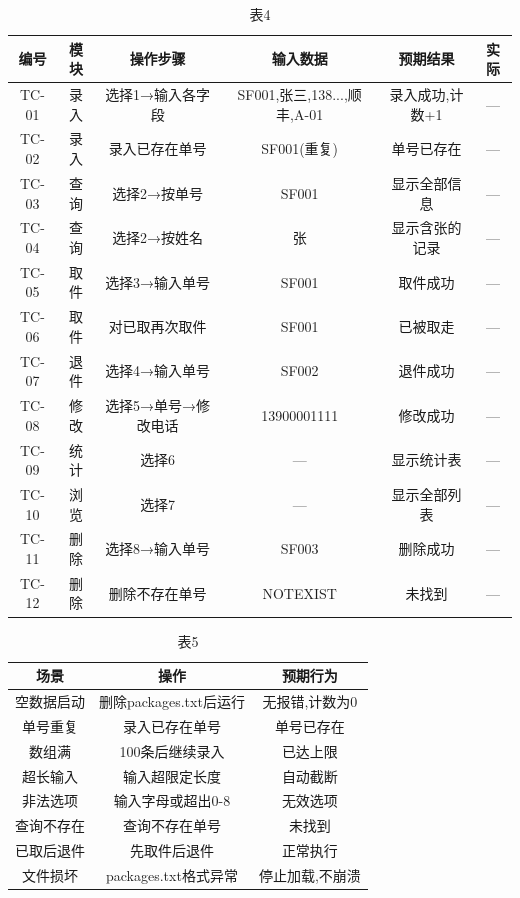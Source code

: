 \documentclass[withoutpreface,bwprint]{cumcmthesis}
\begin{document}
\begin{table}[H]
  \centering
  \caption{表4}
  \label{tab:4}
  \begin{tabular}{|c|c|c|c|c|c|}
    \hline
    编号 & 模块 & 操作步骤 & 输入数据 & 预期结果 & 实际 \\ \hline
    TC-01 & 录入 & 选择1→输入各字段 & SF001,张三,138...,顺丰,A-01 & 录入成功,计数+1 & --- \\ \hline
    TC-02 & 录入 & 录入已存在单号 & SF001(重复) & 单号已存在 & --- \\ \hline
    TC-03 & 查询 & 选择2→按单号 & SF001 & 显示全部信息 & --- \\ \hline
    TC-04 & 查询 & 选择2→按姓名 & 张 & 显示含张的记录 & --- \\ \hline
    TC-05 & 取件 & 选择3→输入单号 & SF001 & 取件成功 & --- \\ \hline
    TC-06 & 取件 & 对已取再次取件 & SF001 & 已被取走 & --- \\ \hline
    TC-07 & 退件 & 选择4→输入单号 & SF002 & 退件成功 & --- \\ \hline
    TC-08 & 修改 & 选择5→单号→修改电话 & 13900001111 & 修改成功 & --- \\ \hline
    TC-09 & 统计 & 选择6 & — & 显示统计表 & --- \\ \hline
    TC-10 & 浏览 & 选择7 & — & 显示全部列表 & --- \\ \hline
    TC-11 & 删除 & 选择8→输入单号 & SF003 & 删除成功 & --- \\ \hline
    TC-12 & 删除 & 删除不存在单号 & NOTEXIST & 未找到 & --- \\ \hline
  \end{tabular}
\end{table}

\begin{table}[H]
  \centering
  \caption{表5}
  \label{tab:5}
  \begin{tabular}{|c|c|c|}
    \hline
    场景 & 操作 & 预期行为 \\ \hline
    空数据启动 & 删除packages.txt后运行 & 无报错,计数为0 \\ \hline
    单号重复 & 录入已存在单号 & 单号已存在 \\ \hline
    数组满 & 100条后继续录入 & 已达上限 \\ \hline
    超长输入 & 输入超限定长度 & 自动截断 \\ \hline
    非法选项 & 输入字母或超出0-8 & 无效选项 \\ \hline
    查询不存在 & 查询不存在单号 & 未找到 \\ \hline
    已取后退件 & 先取件后退件 & 正常执行 \\ \hline
    文件损坏 & packages.txt格式异常 & 停止加载,不崩溃 \\ \hline
  \end{tabular}
\end{table}
\end{document}
